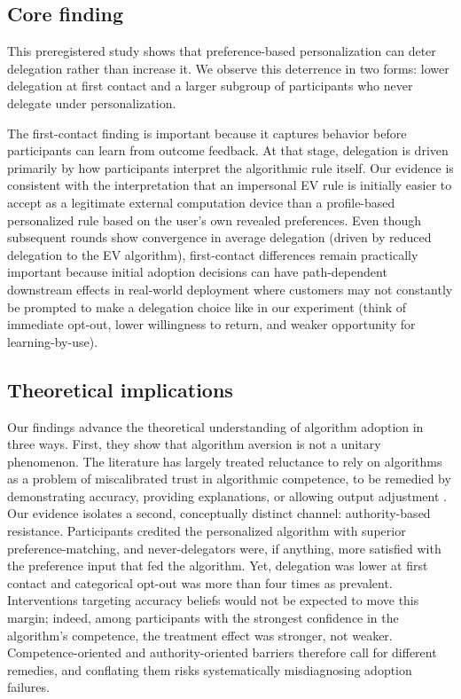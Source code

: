 \documentclass[a4paper, 12pt, fleqn]{article}
\theoremstyle{definition}
\begin{document}
\subsection{Core finding}
This preregistered study shows that preference-based personalization can deter delegation rather than increase it. We observe this deterrence in two forms: lower delegation at first contact and a larger subgroup of participants who never delegate under personalization.

The first-contact finding is important because it captures behavior before participants can learn from outcome feedback. At that stage, delegation is driven primarily by how participants interpret the algorithmic rule itself. Our evidence is consistent with the interpretation that an impersonal EV rule is initially easier to accept as a legitimate external computation device than a profile-based personalized rule based on the user's own revealed preferences. Even though subsequent rounds show convergence in average delegation (driven by reduced delegation to the EV algorithm), first-contact differences remain practically important because initial adoption decisions can have path-dependent downstream effects in real-world deployment where customers may not constantly be prompted to make a delegation choice like in our experiment (think of immediate opt-out, lower willingness to return, and weaker opportunity for learning-by-use).

\subsection{Theoretical implications}
Our findings advance the theoretical understanding of algorithm adoption in three ways.
First, they show that algorithm aversion is not a unitary phenomenon. The literature has largely treated reluctance to rely on algorithms as a problem of miscalibrated trust in algorithmic competence, to be remedied by demonstrating accuracy, providing explanations, or allowing output adjustment \citep{Dietvorst2018,Yeomans2019,Leichtmann2023}. Our evidence isolates a second, conceptually distinct channel: authority-based resistance. Participants credited the personalized algorithm with superior preference-matching, and never-delegators were, if anything, more satisfied with the preference input that fed the algorithm. Yet, delegation was lower at first contact and categorical opt-out was more than four times as prevalent. Interventions targeting accuracy beliefs would not be expected to move this margin; indeed, among participants with the strongest confidence in the algorithm's competence, the treatment effect was stronger, not weaker. Competence-oriented and authority-oriented barriers therefore call for different remedies, and conflating them risks systematically misdiagnosing adoption failures.
\end{document}
